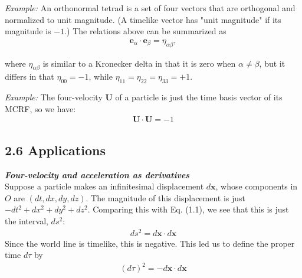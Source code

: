 \documentclass[12pt]{book}
\begin{document}
        \textit{Example:} An orthonormal tetrad is a set of four vectors that are orthogonal and normalized to unit magnitude. (A timelike vector has "unit magnitude" if its magnitude is \(-1\).) The relations above can be summarized as
        \begin{align}
        \mathbf{e}_\alpha \cdot \mathbf{e}_\beta = \eta_{\alpha\beta},
        \end{align}
        
        where \(\eta_{\alpha\beta}\) is similar to a Kronecker delta in that it is zero when \(\alpha \neq \beta\), but it differs in that \(\eta_{00} = -1\), while \(\eta_{11} = \eta_{22} = \eta_{33} = +1\).
    
         \textit{Example:} The four-velocity \(\mathbf{U}\) of a particle is just the time basis vector of its MCRF, so we have:
        \begin{align}
            \mathbf{U}\cdot \mathbf{U} = -1
        \end{align}
        
        
    \subsection{2.6 Applications }

    \textit{\textbf{Four-velocity and acceleration as derivatives}}\\
    
        Suppose a particle makes an infinitesimal displacement \( d\mathbf{x} \), whose components in \( O \) are \( (dt, dx, dy, dz) \). The magnitude of this displacement is just \( -dt^2 + dx^2 + dy^2 + dz^2 \). Comparing this with Eq. (1.1), we see that this is just the interval, \( ds^2 \):
        \begin{align}
        ds^2 = d\mathbf{x} \cdot d\mathbf{x}
        \end{align}
        Since the world line is timelike, this is negative. This led us to define the proper time \( d\tau \) by
        \begin{align}
        (d\tau)^2 = -d\mathbf{x} \cdot d\mathbf{x}
        \end{align}
        
\end{document}
